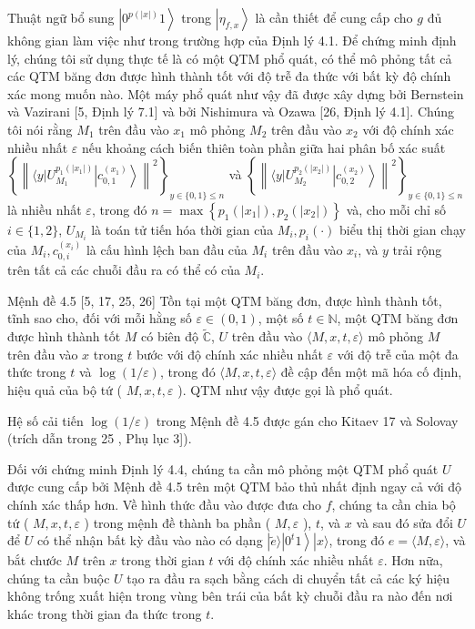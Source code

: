 \documentclass[10pt]{article}
\begin{document}
Thuật ngữ bổ sung $\left|0^{p(|x|)} 1\right\rangle$ trong $\left|\eta_{f, x}\right\rangle$ là cần thiết để cung cấp cho $g$ đủ không gian làm việc như trong trường hợp của Định lý 4.1. Để chứng minh định lý, chúng tôi sử dụng thực tế là có một QTM phổ quát, có thể mô phỏng tất cả các QTM băng đơn được hình thành tốt với độ trễ đa thức với bất kỳ độ chính xác mong muốn nào. Một máy phổ quát như vậy đã được xây dựng bởi Bernstein và Vazirani [5, Định lý 7.1] và bởi Nishimura và Ozawa [26, Định lý 4.1]. Chúng tôi nói rằng $M_{1}$ trên đầu vào $x_{1}$ mô phỏng $M_{2}$ trên đầu vào $x_{2}$ với độ chính xác nhiều nhất $\varepsilon$ nếu khoảng cách biến thiên toàn phần giữa hai phân bố xác suất $\left\{\left\|\langle y| U_{M_{1}}^{p_{1}\left(\left|x_{1}\right|\right)}\left|c_{0,1}^{\left(x_{1}\right)}\right\rangle\right\|^{2}\right\}_{y \in\{0,1\} \leq n}$ và $\left\{\left\|\langle y| U_{M_{2}}^{p_{2}\left(\left|x_{2}\right|\right)}\left|c_{0,2}^{\left(x_{2}\right)}\right\rangle\right\|^{2}\right\}_{y \in\{0,1\} \leq n}$ là nhiều nhất $\varepsilon$, trong đó $n=\max \left\{p_{1}\left(\left|x_{1}\right|\right), p_{2}\left(\left|x_{2}\right|\right)\right\}$ và, cho mỗi chỉ số $i \in\{1,2\}$, $U_{M_{i}}$ là toán tử tiến hóa thời gian của $M_{i}, p_{i}(\cdot)$ biểu thị thời gian chạy của $M_{i}, c_{0, i}^{\left(x_{i}\right)}$ là cấu hình lệch ban đầu của $M_{i}$ trên đầu vào $x_{i}$, và $y$ trải rộng trên tất cả các chuỗi đầu ra có thể có của $M_{i}$.

Mệnh đề 4.5 [5, 17, 25, 26] Tồn tại một QTM băng đơn, được hình thành tốt, tĩnh sao cho, đối với mỗi hằng số $\varepsilon \in(0,1)$, một số $t \in \mathbb{N}$, một QTM băng đơn được hình thành tốt $M$ có biên độ $\tilde{\mathbb{C}}$, $U$ trên đầu vào $\langle M, x, t, \varepsilon\rangle$ mô phỏng $M$ trên đầu vào $x$ trong $t$ bước với độ chính xác nhiều nhất $\varepsilon$ với độ trễ của một đa thức trong $t$ và $\log (1 / \varepsilon)$, trong đó $\langle M, x, t, \varepsilon\rangle$ đề cập đến một mã hóa cố định, hiệu quả của bộ tứ ( $M, x, t, \varepsilon$ ). QTM như vậy được gọi là phổ quát.

Hệ số cải tiến $\log (1 / \varepsilon)$ trong Mệnh đề 4.5 được gán cho Kitaev 17 và Solovay (trích dẫn trong 25 , Phụ lục 3]).

Đối với chứng minh Định lý 4.4, chúng ta cần mô phỏng một QTM phổ quát $U$ được cung cấp bởi Mệnh đề 4.5 trên một QTM bảo thủ nhất định ngay cả với độ chính xác thấp hơn. Về hình thức đầu vào được đưa cho $f$, chúng ta cần chia bộ tứ ( $M, x, t, \varepsilon$ ) trong mệnh đề thành ba phần ( $M, \varepsilon$ ), $t$, và $x$ và sau đó sửa đổi $U$ để $U$ có thể nhận bất kỳ đầu vào nào có dạng $|\tilde{e}\rangle\left|0^{t} 1\right\rangle|x\rangle$, trong đó $e=\langle M, \varepsilon\rangle$, và bắt chước $M$ trên $x$ trong thời gian $t$ với độ chính xác nhiều nhất $\varepsilon$. Hơn nữa, chúng ta cần buộc $U$ tạo ra đầu ra sạch bằng cách di chuyển tất cả các ký hiệu không trống xuất hiện trong vùng bên trái của bất kỳ chuỗi đầu ra nào đến nơi khác trong thời gian đa thức trong $t$.
\end{document}
